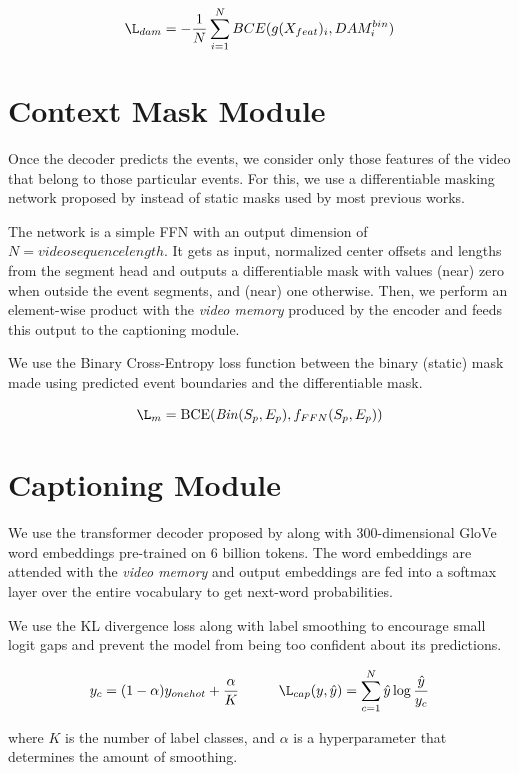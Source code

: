 $$\L_{dam} = -\frac{1}{N}\displaystyle\sum\limits_{i=1}^N BCE(g(X_{feat})_i, DAM^{bin}_i)$$


\section{Context Mask Module}
\par Once the decoder predicts the events, we consider only those features of the video that belong to those particular events. For this, we use a differentiable masking network proposed by \cite{endtoend} instead of static masks used by most previous works.
\par The network is a simple FFN with an output dimension of $N=video sequence length$. It gets as input, normalized center offsets and lengths from the segment head and outputs a differentiable mask with values (near) zero when outside the event segments, and (near) one otherwise. Then, we perform an element-wise product with the \textit{video memory} produced by the encoder and feeds this output to the captioning module.
\par We use the Binary Cross-Entropy loss function between the binary (static) mask made using predicted event boundaries and the differentiable mask.

$$\L_{m} = \textrm{BCE}(\mathit{Bin}(S_{p}, E_{p}), f_{FFN}(S_{p}, E_{p}))$$

\section{Captioning Module}
\par We use the transformer decoder proposed by \cite{tfm} along with 300-dimensional GloVe word embeddings pre-trained on 6 billion tokens\cite{glove}. The word embeddings are attended with the \textit{video memory} and output embeddings are fed into a softmax layer over the entire vocabulary to get next-word probabilities.
\par We use the KL divergence loss along with label smoothing to encourage small logit gaps and prevent the model from being too confident about its predictions.

$$y _{c}= (1 - \alpha)y_{onehot} + \frac{\alpha}{K} \hspace{1cm} \L_{cap}(y, \hat{y}) = \sum_{c=1}^{N}\hat{y} \log{\frac{\hat{y}}{y_c}}$$

\par where $K$ is the number of label classes, and $\alpha$ is a hyperparameter that determines the amount of smoothing.

